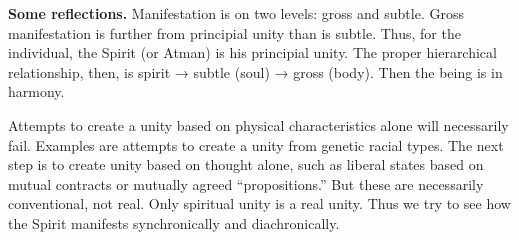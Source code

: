 \textbf{Some reflections.} Manifestation is on two levels: gross and subtle. Gross manifestation is further from principial unity than is subtle. Thus, for the individual, the Spirit (or Atman) is his principial unity. The proper hierarchical relationship, then, is spirit → subtle (soul) → gross (body). Then the being is in harmony.

Attempts to create a unity based on physical characteristics alone will necessarily fail. Examples are attempts to create a unity from genetic racial types. The next step is to create unity based on thought alone, such as liberal states based on mutual contracts or mutually agreed “propositions.” But these are necessarily conventional, not real. Only spiritual unity is a real unity. Thus we try to see how the Spirit manifests synchronically and diachronically.



